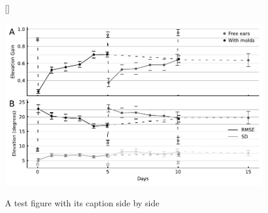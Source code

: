 \begin{figure}[hb]
[\FBwidth]
{\caption{A test figure with its caption side by side}\label{fig:test}}
{\includegraphics[width=13cm]{../Results/figures/ele_learning/ele_learning}}
\end{figure}
